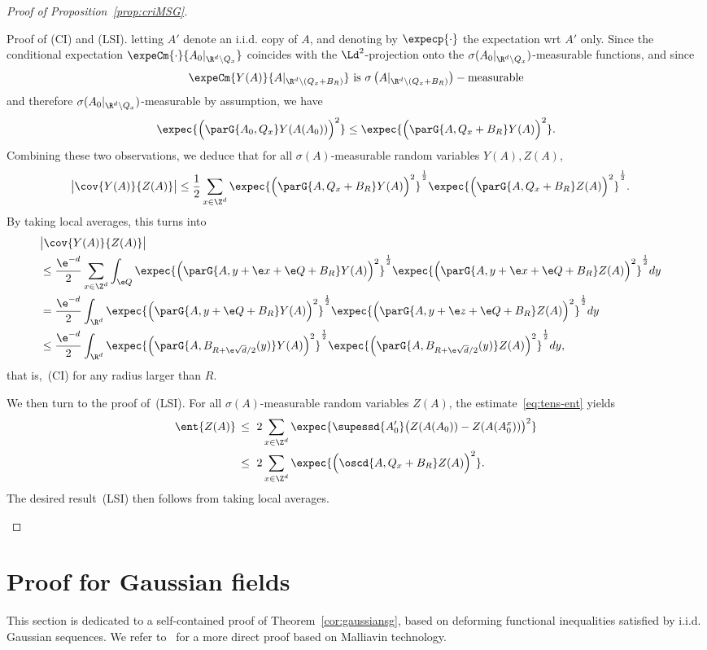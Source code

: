 \begin{proof}[Proof of Proposition~\ref{prop:criMSG}]
\begin{step}{Proof of (CI) and (LSI).}
letting $A'$ denote an i.i.d. copy of $A$, and denoting by $\expecp{\cdot}$ the expectation wrt $A'$ only. Since the conditional expectation $\expeCm{\cdot}{A_0|_{\R^d\setminus Q_x}}$ coincides with the $\Ld^2$-projection onto the $\sigma(A_0|_{\R^d\setminus Q_x})$-measurable functions, and since
\[
\expeCm{Y(A)}{A|_{\R^d\setminus (Q_x+B_R)}} \text{ is }\sigma\left(A|_{\R^d\setminus(Q_x+B_R)}\right)-\text{measurable}
\]
and therefore $\sigma(A_0|_{\R^d\setminus Q_x})$-measurable by assumption, we have
\[
\expec{\Big(\parG{A_0,Q_x}Y(A(A_0))\Big)^2}\le\expec{\Big(\parG{A,Q_x+B_R}Y(A)\Big)^2}.
\]
Combining these two observations, we deduce that for all $\sigma(A)$-measurable random variables $Y(A),Z(A)$,
\begin{align*}
\big|\cov{Y(A)}{Z(A)}\big|&\le\frac12\sum_{x\in\Z^d}\expec{\Big(\parG{A,Q_x+B_R}Y(A)\Big)^2}^\frac12\expec{\Big(\parG{A,Q_x+B_R}Z(A)\Big)^2}^\frac12.
\end{align*}
By taking local averages, this turns into
\begin{align*}
\lefteqn{\big|\cov{Y(A)}{Z(A)}\big|}
\\
&\le\frac{\e^{-d}}2\sum_{x\in\Z^d}\int_{\e Q}\expec{\Big(\parG{A,y+\e x+\e Q+B_R}Y(A)\Big)^2}^\frac12\expec{\Big(\parG{A,y+\e x+\e Q+B_R}Z(A)\Big)^2}^\frac12dy\\
&=\frac{\e^{-d}}2\int_{\R^d}\expec{\Big(\parG{A,y+\e Q+B_R}Y(A)\Big)^2}^\frac12\expec{\Big(\parG{A,y+\e z+\e Q+B_R}Z(A)\Big)^2}^\frac12dy\\
&\le\frac{\e^{-d}}2\int_{\R^d}\expec{\Big(\parG{A,B_{R+\e\sqrt d/2}(y)}Y(A)\Big)^2}^\frac12\expec{\Big(\parG{A,B_{R+\e\sqrt d/2}(y)}Z(A)\Big)^2}^\frac12dy,
\end{align*}
that is,~(CI) for any radius larger than $R$.

\noindent We then turn to the proof of~(LSI). For all $\sigma(A)$-measurable random variables $Z(A)$, the estimate~\eqref{eq:tens-ent} yields
\begin{align*}
\ent{Z(A)}\,&\le~2\sum_{x\in\Z^d}\expec{\supessd{A_0'}\big(Z(A(A_0))-Z(A(A_0^{x}))\big)^2}
\\
&\le~2\sum_{x\in\Z^d}\expec{\Big(\oscd{A,Q_x+B_R}Z(A)\Big)^2}.
\end{align*}
The desired result~(LSI) then follows from taking local averages.
\end{step}
\end{proof}


\section{Proof for Gaussian fields}\label{chap:condunif}
This section is dedicated to a self-contained proof of Theorem~\ref{cor:gaussiansg}, based on deforming functional inequalities satisfied by i.i.d. Gaussian sequences. We refer to~\cite[Appendix~A]{DG3} for a more direct proof based on Malliavin technology.

